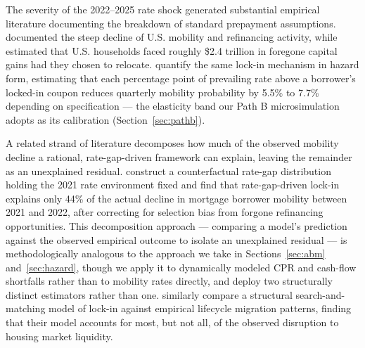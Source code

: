 \documentclass[12pt]{article}
\begin{document}
The severity of the 2022--2025 rate shock generated substantial empirical literature documenting the breakdown of standard prepayment assumptions. \citet{fonseca2024} documented the steep decline of U.S. mobility and refinancing activity, while \citet{batzer2024} estimated that U.S. households faced roughly \$2.4 trillion in foregone capital gains had they chosen to relocate. \citet{liebersohn2024} quantify the same lock-in mechanism in hazard form, estimating that each percentage point of prevailing rate above a borrower's locked-in coupon reduces quarterly mobility probability by 5.5\% to 7.7\% depending on specification --- the elasticity band our Path B microsimulation adopts as its calibration (Section~\ref{sec:pathb}).

A related strand of literature decomposes how much of the observed mobility decline a rational, rate-gap-driven framework can explain, leaving the remainder as an unexplained residual. \citet{aladangady2024} construct a counterfactual rate-gap distribution holding the 2021 rate environment fixed and find that rate-gap-driven lock-in explains only 44\% of the actual decline in mortgage borrower mobility between 2021 and 2022, after correcting for selection bias from forgone refinancing opportunities. This decomposition approach --- comparing a model's prediction against the observed empirical outcome to isolate an unexplained residual --- is methodologically analogous to the approach we take in Sections~\ref{sec:abm} and~\ref{sec:hazard}, though we apply it to dynamically modeled CPR and cash-flow shortfalls rather than to mobility rates directly, and deploy two structurally distinct estimators rather than one. \citet{gerardi2024} similarly compare a structural search-and-matching model of lock-in against empirical lifecycle migration patterns, finding that their model accounts for most, but not all, of the observed disruption to housing market liquidity.
\end{document}
